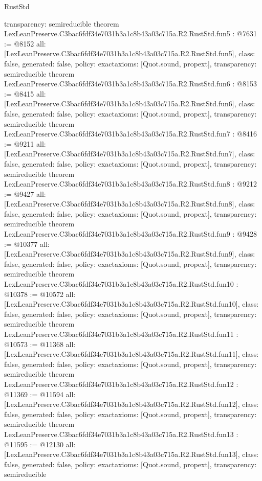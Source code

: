 \begin{lexlean}{RustStd}
\begin{coremodule}
{  transparency: semireducible
}
theorem LexLeanPreserve.C3bac6fdf34e7031b3a1c8b43a03c715a.R2.RustStd.fun5 : @7631 := @8152 {
  all: [LexLeanPreserve.C3bac6fdf34e7031b3a1c8b43a03c715a.R2.RustStd.fun5],
  class: false,
  generated: false,
  policy: exact{axioms: [Quot.sound, propext]},
  transparency: semireducible
}
theorem LexLeanPreserve.C3bac6fdf34e7031b3a1c8b43a03c715a.R2.RustStd.fun6 : @8153 := @8415 {
  all: [LexLeanPreserve.C3bac6fdf34e7031b3a1c8b43a03c715a.R2.RustStd.fun6],
  class: false,
  generated: false,
  policy: exact{axioms: [Quot.sound, propext]},
  transparency: semireducible
}
theorem LexLeanPreserve.C3bac6fdf34e7031b3a1c8b43a03c715a.R2.RustStd.fun7 : @8416 := @9211 {
  all: [LexLeanPreserve.C3bac6fdf34e7031b3a1c8b43a03c715a.R2.RustStd.fun7],
  class: false,
  generated: false,
  policy: exact{axioms: [Quot.sound, propext]},
  transparency: semireducible
}
theorem LexLeanPreserve.C3bac6fdf34e7031b3a1c8b43a03c715a.R2.RustStd.fun8 : @9212 := @9427 {
  all: [LexLeanPreserve.C3bac6fdf34e7031b3a1c8b43a03c715a.R2.RustStd.fun8],
  class: false,
  generated: false,
  policy: exact{axioms: [Quot.sound, propext]},
  transparency: semireducible
}
theorem LexLeanPreserve.C3bac6fdf34e7031b3a1c8b43a03c715a.R2.RustStd.fun9 : @9428 := @10377 {
  all: [LexLeanPreserve.C3bac6fdf34e7031b3a1c8b43a03c715a.R2.RustStd.fun9],
  class: false,
  generated: false,
  policy: exact{axioms: [Quot.sound, propext]},
  transparency: semireducible
}
theorem LexLeanPreserve.C3bac6fdf34e7031b3a1c8b43a03c715a.R2.RustStd.fun10 : @10378 := @10572 {
  all: [LexLeanPreserve.C3bac6fdf34e7031b3a1c8b43a03c715a.R2.RustStd.fun10],
  class: false,
  generated: false,
  policy: exact{axioms: [Quot.sound, propext]},
  transparency: semireducible
}
theorem LexLeanPreserve.C3bac6fdf34e7031b3a1c8b43a03c715a.R2.RustStd.fun11 : @10573 := @11368 {
  all: [LexLeanPreserve.C3bac6fdf34e7031b3a1c8b43a03c715a.R2.RustStd.fun11],
  class: false,
  generated: false,
  policy: exact{axioms: [Quot.sound, propext]},
  transparency: semireducible
}
theorem LexLeanPreserve.C3bac6fdf34e7031b3a1c8b43a03c715a.R2.RustStd.fun12 : @11369 := @11594 {
  all: [LexLeanPreserve.C3bac6fdf34e7031b3a1c8b43a03c715a.R2.RustStd.fun12],
  class: false,
  generated: false,
  policy: exact{axioms: [Quot.sound, propext]},
  transparency: semireducible
}
theorem LexLeanPreserve.C3bac6fdf34e7031b3a1c8b43a03c715a.R2.RustStd.fun13 : @11595 := @12130 {
  all: [LexLeanPreserve.C3bac6fdf34e7031b3a1c8b43a03c715a.R2.RustStd.fun13],
  class: false,
  generated: false,
  policy: exact{axioms: [Quot.sound, propext]},
  transparency: semireducible
}
\end{coremodule}
\end{lexlean}

